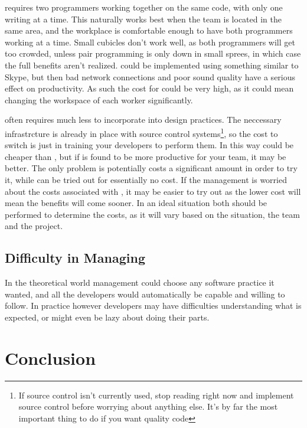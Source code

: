 \documentclass{article}
\begin{document}
\PP requires two programmers working together on the same code, with only one writing at a time. This naturally works best when the team is located in the same area, and the workplace is comfortable enough to have both programmers working at a time. Small cubicles don't work well, as both programmers will get too crowded, unless pair programming is only down in small sprees, in which case the full benefits aren't realized. \PP could be implemented using something similar to Skype, but then bad network connections and poor sound quality have a serious effect on productivity. As such the cost for \PP could be very high, as it could mean changing the workspace of each worker significantly.

\CR often requires much less to incorporate into design practices. The neccessary infrastrcture is already in place with source control systems\footnote{If source control isn't currently used, stop reading right now and implement source control before worrying about anything else. It's by far the most important thing to do if you want quality code}, so the cost to switch is just in training your developers to perform them. In this way \CR could be cheaper than \PP, but if \PP is found to be more productive for your team, it may be better. The only problem is \PP potentially costs a significant amount in order to try it, while \CR can be tried out for essentially no cost. If the management is worried about the costs associated with \PP, it may be easier to try out \CR as the lower cost will mean the benefits will come sooner. In an ideal situation both should be performed to determine the costs, as it will vary based on the situation, the team and the project.


\subsection{Difficulty in Managing}

In the theoretical world management could choose any software practice it wanted, and all the developers would automatically be capable and willing to follow. In practice however developers may have difficulties understanding what is expected, or might even be lazy about doing their parts.

\section{Conclusion}







\end{document}
